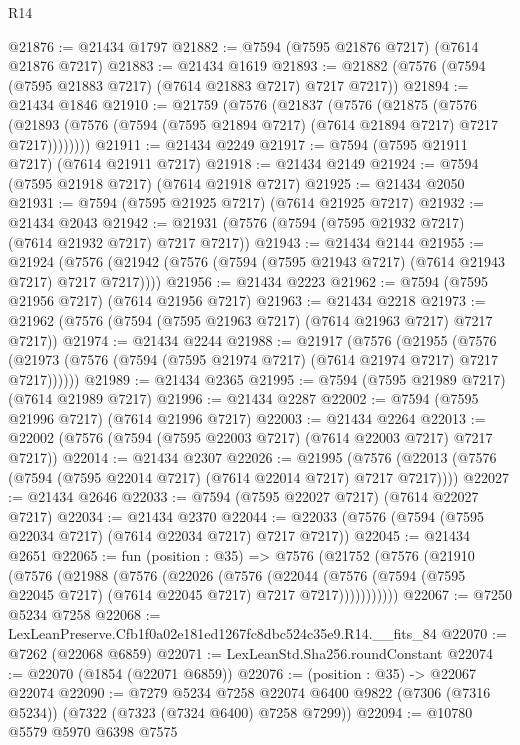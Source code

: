\begin{lexlean}{R14}
\begin{coremodule}
@21876 := @21434 @1797
@21882 := @7594 (@7595 @21876 @7217) (@7614 @21876 @7217)
@21883 := @21434 @1619
@21893 := @21882 (@7576 (@7594 (@7595 @21883 @7217) (@7614 @21883 @7217) @7217 @7217))
@21894 := @21434 @1846
@21910 := @21759
    (@7576
      (@21837
        (@7576
          (@21875
            (@7576
              (@21893 (@7576 (@7594 (@7595 @21894 @7217) (@7614 @21894 @7217) @7217 @7217))))))))
@21911 := @21434 @2249
@21917 := @7594 (@7595 @21911 @7217) (@7614 @21911 @7217)
@21918 := @21434 @2149
@21924 := @7594 (@7595 @21918 @7217) (@7614 @21918 @7217)
@21925 := @21434 @2050
@21931 := @7594 (@7595 @21925 @7217) (@7614 @21925 @7217)
@21932 := @21434 @2043
@21942 := @21931 (@7576 (@7594 (@7595 @21932 @7217) (@7614 @21932 @7217) @7217 @7217))
@21943 := @21434 @2144
@21955 := @21924
    (@7576 (@21942 (@7576 (@7594 (@7595 @21943 @7217) (@7614 @21943 @7217) @7217 @7217))))
@21956 := @21434 @2223
@21962 := @7594 (@7595 @21956 @7217) (@7614 @21956 @7217)
@21963 := @21434 @2218
@21973 := @21962 (@7576 (@7594 (@7595 @21963 @7217) (@7614 @21963 @7217) @7217 @7217))
@21974 := @21434 @2244
@21988 := @21917
    (@7576
      (@21955
        (@7576 (@21973 (@7576 (@7594 (@7595 @21974 @7217) (@7614 @21974 @7217) @7217 @7217))))))
@21989 := @21434 @2365
@21995 := @7594 (@7595 @21989 @7217) (@7614 @21989 @7217)
@21996 := @21434 @2287
@22002 := @7594 (@7595 @21996 @7217) (@7614 @21996 @7217)
@22003 := @21434 @2264
@22013 := @22002 (@7576 (@7594 (@7595 @22003 @7217) (@7614 @22003 @7217) @7217 @7217))
@22014 := @21434 @2307
@22026 := @21995
    (@7576 (@22013 (@7576 (@7594 (@7595 @22014 @7217) (@7614 @22014 @7217) @7217 @7217))))
@22027 := @21434 @2646
@22033 := @7594 (@7595 @22027 @7217) (@7614 @22027 @7217)
@22034 := @21434 @2370
@22044 := @22033 (@7576 (@7594 (@7595 @22034 @7217) (@7614 @22034 @7217) @7217 @7217))
@22045 := @21434 @2651
@22065 := fun (position : @35) =>
  @7576
    (@21752
      (@7576
        (@21910
          (@7576
            (@21988
              (@7576
                (@22026
                  (@7576
                    (@22044
                      (@7576 (@7594 (@7595 @22045 @7217) (@7614 @22045 @7217) @7217 @7217)))))))))))
@22067 := @7250 @5234 @7258
@22068 := LexLeanPreserve.Cfb1f0a02e181ed1267fc8dbc524c35e9.R14.__fits_84
@22070 := @7262 (@22068 @6859)
@22071 := LexLeanStd.Sha256.roundConstant
@22074 := @22070 (@1854 (@22071 @6859))
@22076 := (position : @35) -> @22067 @22074
@22090 := @7279
    @5234
    @7258
    @22074
    @6400
    @9822
    (@7306 (@7316 @5234))
    (@7322 (@7323 (@7324 @6400) @7258 @7299))
@22094 := @10780 @5579 @5970 @6398 @7575

\end{coremodule}
\end{lexlean}
